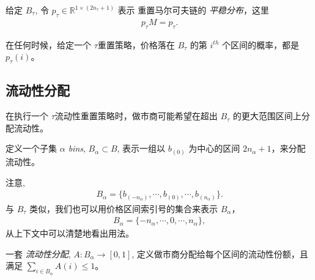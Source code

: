 \documentclass[sigconf, dvipsnames]{acmart}
\begin{document}
\begin{definition}
给定 $B_{\tau}$, 令  $p_{\tau} \in \mathbb{R}^{1 \times (2n_{\tau}+1)}$ 表示
重置马尔可夫链的 \textit{平稳分布}，这里
\begin{align}
    p_{\tau} M = p_{\tau}.
\end{align}
\end{definition}

在任何时候，给定一个 $\tau$重置策略，价格落在 $B_{\tau}$ 的第 $i^{th}$ 个区间的概率，都是 $p_{\tau}(i)$。

\subsection{流动性分配}

\quad 在执行一个 $\tau$流动性重置策略时，做市商可能希望在超出 $B_{\tau}$ 的更大范围区间上分配流动性。
%
\begin{definition}
定义一个子集 \textit{$\alpha$ bins}, $B_{\alpha} \subset B$, 表示一组以 $b_{(0)}$ 为中心的区间 $2n_{\alpha}+1$，来分配流动性。
\end{definition}

注意,
\begin{align}
    B_{\alpha} = \{b_{(-n_{\alpha})}, \cdots, b_{(0)}, \cdots, b_{(n_{\alpha})}\}.
\end{align}
与 $B_{\tau}$ 类似，我们也可以用价格区间索引号的集合来表示 $B_{\alpha}$，
\begin{align}
    B_{\alpha} = \{-n_{\alpha}, \cdots, 0, \cdots, n_{\alpha}\},
\end{align}
从上下文中可以清楚地看出用法。
%
\begin{definition}
一套 \textit{流动性分配}, $A \colon B_{\alpha} \to [0,1]$, 定义做市商分配给每个区间的流动性份额，且满足 $\sum_{i \in B_{\alpha}} A(i) \leq 1$。
\end{definition}
\end{document}
